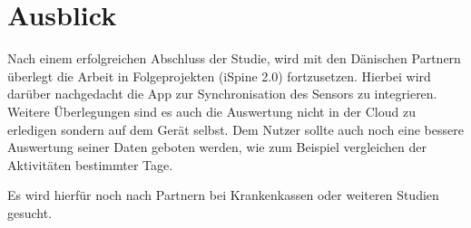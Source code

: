 \chapter{Ausblick}
Nach einem erfolgreichen Abschluss der Studie, wird mit den Dänischen Partnern überlegt die Arbeit in Folgeprojekten (iSpine 2.0) fortzusetzen. Hierbei wird darüber nachgedacht die App zur Synchronisation des Sensors zu integrieren. Weitere Überlegungen sind es auch die Auswertung nicht in der Cloud zu erledigen sondern auf dem Gerät selbst. Dem Nutzer sollte auch noch eine bessere Auswertung seiner Daten geboten werden, wie zum Beispiel vergleichen der Aktivitäten bestimmter Tage.

Es wird hierfür noch nach Partnern bei Krankenkassen oder weiteren Studien gesucht.

